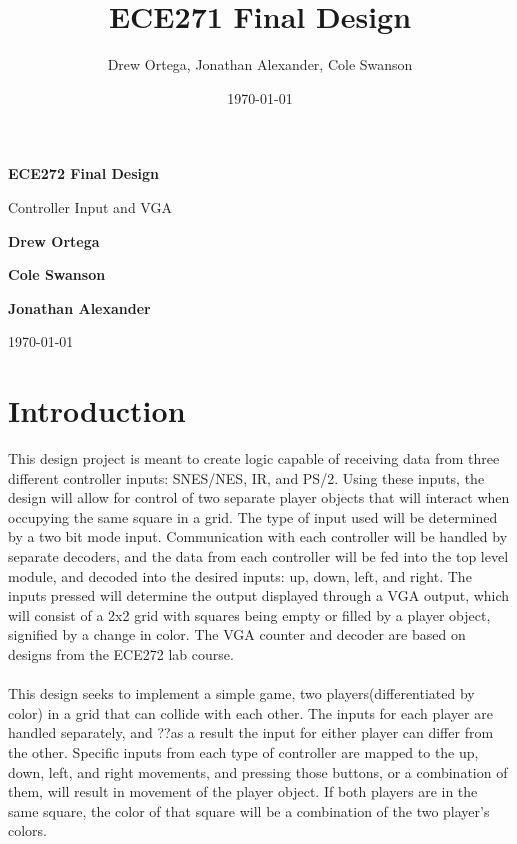 \documentclass[]{article}
\title{ECE271 Final Design}
\author{Drew Ortega, Jonathan Alexander, Cole Swanson}
\date{\today}
\begin{document}
\begin{titlepage}
    \begin{center}
        \vspace*{1cm}
 
        \Huge
        \textbf{ECE272 Final Design}
 
        \vspace{0.5cm}
        \LARGE
        Controller Input and VGA
 
        \vspace{1.5cm}
 
        \textbf{Drew Ortega}
        
        \textbf{Cole Swanson}
        
        \textbf{Jonathan Alexander}
 
 		\vspace{0.5cm}
        \today
 
    \end{center}
\end{titlepage}

\newpage
	\tableofcontents
\newpage

\section{Introduction}
This design project is meant to create logic capable of receiving data from three different controller inputs: SNES/NES, IR, and PS/2. Using these inputs, the design will allow for control of two separate player objects that will interact when occupying the same square in a grid. The type of input used will be determined by a two bit mode input. Communication with each controller will be handled by separate decoders, and the data from each controller will be fed into the top level module, and decoded into the desired inputs: up, down, left, and right. The inputs pressed will determine the output displayed through a VGA output, which will consist of a 2x2 grid with squares being empty or filled by a player object, signified by a change in color. The VGA counter and decoder are based on designs from the ECE272 lab course. \\~\\
This design seeks to implement a simple game, two players(differentiated by color) in a grid that can collide with each other. The inputs for each player are handled separately, and ??as a result the input for either player can differ from the other. Specific inputs from each type of controller are mapped to the up, down, left, and right movements, and pressing those buttons, or a combination of them, will result in movement of the player object. If both players are in the same square, the color of that square will be a combination of the two player's colors. 
\end{document}
